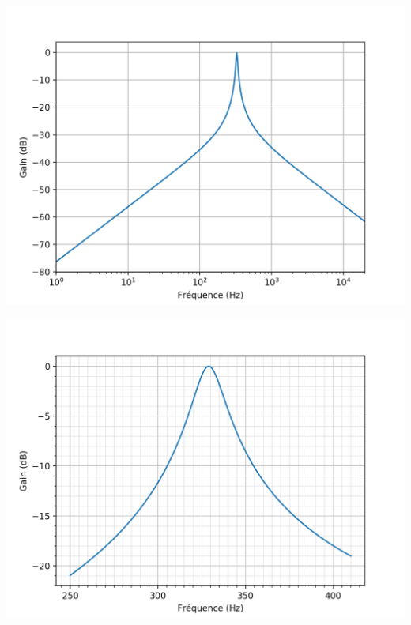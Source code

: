 \documentclass[a4paper,french,bookmarks]{article}
\begin{document}
\begin{center}
	\begin{minipage}[c]{0.49\linewidth}
		\includegraphics[width=0.9\linewidth]{dm6fig/Fig-passebande-bode-2}
	\end{minipage}
	\begin{minipage}[c]{0.49\linewidth}
		\includegraphics[width=0.9\linewidth]{dm6fig/Fig-passebande-bode-1}
	\end{minipage}
\end{center}
\end{document}
